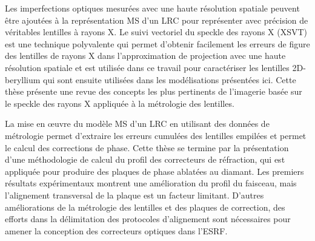 Les imperfections optiques mesurées avec une haute résolution spatiale peuvent être ajoutées à la représentation MS d'un LRC pour représenter avec précision de véritables lentilles à rayons X. Le suivi vectoriel du speckle des rayons X (XSVT) est une technique polyvalente qui permet d'obtenir facilement les erreurs de figure des lentilles de rayons X dans l'approximation de projection avec une haute résolution spatiale et est utilisée dans ce travail pour caractériser les lentilles 2D-beryllium qui sont ensuite utilisées dans les modélisations présentées ici. Cette thèse présente une revue des concepts les plus pertinents de l'imagerie basée sur le speckle des rayons X appliquée à la métrologie des lentilles.

La mise en œuvre du modèle MS d'un LRC en utilisant des données de métrologie permet d'extraire les erreurs cumulées des lentilles empilées et permet le calcul des corrections de phase. Cette thèse se termine par la présentation d'une méthodologie de calcul du profil des correcteurs de réfraction, qui est appliquée pour produire des plaques de phase ablatées au diamant. Les premiers résultats expérimentaux montrent une amélioration du profil du faisceau, mais l'alignement transversal de la plaque est un facteur limitant. D'autres améliorations de la métrologie des lentilles et des plaques de correction, des efforts dans la délimitation des protocoles d'alignement sont nécessaires pour amener la conception des correcteurs optiques dans l'ESRF.